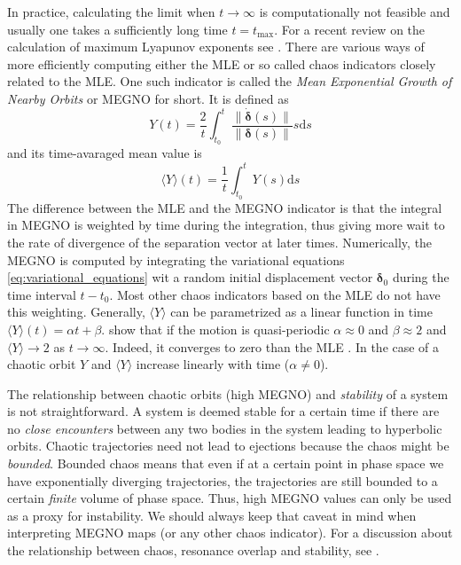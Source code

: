 \documentclass[twoside,openright,titlepage,numbers=noenddot,headinclude,%
                footinclude=true,cleardoublepage=empty,abstractoff, 
                BCOR=5mm,paper=a4,fontsize=11pt,%
                american,%
                ]{scrreprt}%
\begin{document}
In practice, calculating the limit when $t\rightarrow\infty$ is 
computationally not feasible and usually one takes a 
sufficiently long time $t=t_\text{max}$. For a recent review on the calculation
of maximum Lyapunov exponents see \citet{skokos}.
There are various ways of more efficiently computing either the MLE or so called
chaos indicators closely related to the MLE. One such indicator is called the 
\emph{Mean Exponential Growth of Nearby Orbits} \citep{refId0,cincotta2003} or MEGNO for short. 
It is defined as
\begin{equation}
    Y(t)= \frac{2}{t} \int^t_{t_0} \frac{\lVert \dot{\boldsymbol{\delta}}(s)\rVert}{\lVert 
    \boldsymbol{\delta}(s)\rVert}s\mathrm{d}s
\end{equation}
and its time-avaraged mean value is 
\begin{equation}
    \langle Y\rangle\left( t\right)= \frac{1}{t} \int^t_{t_0} Y(s)\mathrm{d}s
\end{equation}
The difference between the MLE and the MEGNO indicator is that the integral in MEGNO
is weighted by time during the integration, thus giving more wait to the rate 
of divergence of the separation vector at later times. Numerically, the MEGNO
is computed by integrating the variational equations \cref{eq:variational_equations}
wit a random initial displacement vector $\boldsymbol{\delta}_0$
during the time interval $t-t_0$. Most other chaos indicators based on the
MLE do not have this weighting. 
Generally, $\langle Y\rangle$ can be parametrized as a linear function in time
$\langle Y\rangle (t)=\alpha t+\beta$. \citet{cincotta2003} show that if the 
motion is quasi-periodic $\alpha\approx 0$ and $\beta\approx 2$ and 
$\langle Y\rangle \rightarrow 2$ as $t\rightarrow \infty$. Indeed, it
converges to zero than the MLE \citep{cincotta2003}. In the case of a chaotic
orbit $Y$ and $\langle Y\rangle$ increase linearly with time ($\alpha\neq 0$).

The relationship between chaotic orbits (high MEGNO) and \emph{stability} of
a system is not straightforward. A system is deemed stable for a certain time 
if there are no \emph{close encounters}  between any two bodies in the system 
leading to hyperbolic orbits. Chaotic trajectories need not lead to ejections
because the chaos might be \emph{bounded}. Bounded chaos means that even
if at a certain point in phase space we have exponentially diverging 
trajectories, the trajectories are still bounded to a certain \emph{finite} 
volume of phase space. Thus, high MEGNO values can only be used as a proxy
for instability. We should always keep that caveat in mind when 
interpreting MEGNO maps (or any other chaos indicator). For a discussion about 
the relationship between chaos,
 resonance overlap and  stability, see \citet{Deck2013}.
\end{document}
